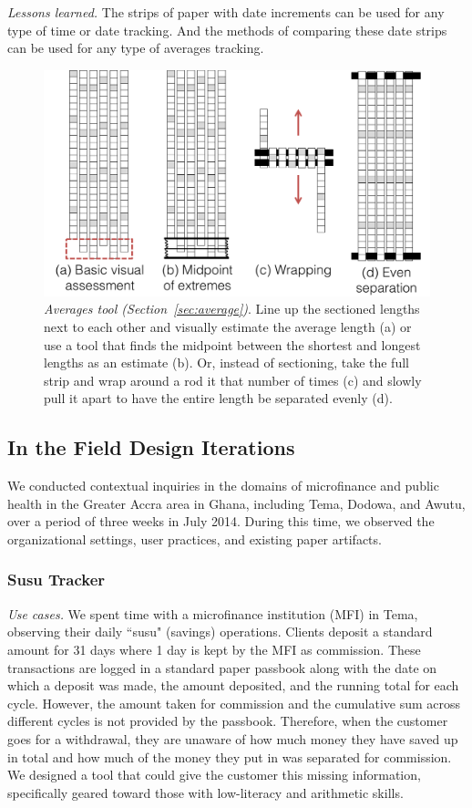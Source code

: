 \documentclass{sig-alternate}
\begin{document}
\emph{Lessons learned.}
The strips of paper with date increments can be used for any type of time or date tracking. And the methods of comparing these date strips can be used for any type of averages tracking. 

\begin{figure}
\centering
\includegraphics[width=\linewidth]{img/average.png}
\caption{\emph{Averages tool (Section~\ref{sec:average})}. Line up the sectioned lengths next to each other and visually estimate the average length (a) or use a tool that finds the midpoint between the shortest and longest lengths as an estimate (b). Or, instead of sectioning, take the full strip and wrap around a rod it that number of times (c) and slowly pull it apart to have the entire length be separated evenly (d).}
\label{fig:average}
\end{figure}

\subsection{In the Field Design Iterations}
\label{sec:field}

We conducted contextual inquiries in the domains of microfinance and public health in the Greater Accra area in Ghana, including Tema, Dodowa, and Awutu, over a period of three weeks in July 2014. During this time, we observed the organizational settings, user practices, and existing paper artifacts. 

\subsubsection{Susu Tracker}
\label{sec:susu}

\emph{Use cases.}
We spent time with a microfinance institution (MFI) in Tema, observing their daily ``susu" (savings) operations. Clients deposit a standard amount for 31 days where 1 day is kept by the MFI as commission. These transactions are logged in a standard paper passbook along with the date on which a deposit was made, the amount deposited, and the running total for each cycle. However, the amount taken for commission and the cumulative sum across different cycles is not provided by the passbook. Therefore, when the customer goes for a withdrawal, they are unaware of how much money they have saved up in total and how much of the money they put in was separated for commission. We designed a tool that could give the customer this missing information, specifically geared toward those with low-literacy and arithmetic skills.
\end{document}

